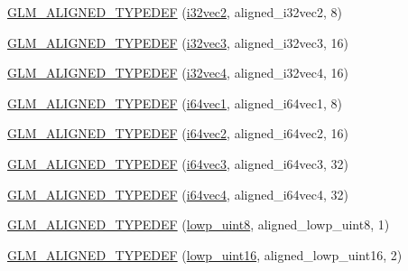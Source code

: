 \begin{DoxyCompactItemize}
\item 
\hyperlink{group__gtx__type__aligned_gaf90651cf2f5e7ee2b11cfdc5a6749534}{G\+L\+M\+\_\+\+A\+L\+I\+G\+N\+E\+D\+\_\+\+T\+Y\+P\+E\+D\+E\+F} (\hyperlink{group__gtc__type__precision_ga25820e641988fe33b075d80434872d02}{i32vec2}, aligned\+\_\+i32vec2, 8)
\item 
\hyperlink{group__gtx__type__aligned_ga7354a4ead8cb17868aec36b9c30d6010}{G\+L\+M\+\_\+\+A\+L\+I\+G\+N\+E\+D\+\_\+\+T\+Y\+P\+E\+D\+E\+F} (\hyperlink{group__gtc__type__precision_gab67e08f6a4b1bce82a9a34ecb2bfba64}{i32vec3}, aligned\+\_\+i32vec3, 16)
\item 
\hyperlink{group__gtx__type__aligned_gad2ecbdea18732163e2636e27b37981ee}{G\+L\+M\+\_\+\+A\+L\+I\+G\+N\+E\+D\+\_\+\+T\+Y\+P\+E\+D\+E\+F} (\hyperlink{group__gtc__type__precision_ga3ada3676600db65a425058c0a150d83e}{i32vec4}, aligned\+\_\+i32vec4, 16)
\item 
\hyperlink{group__gtx__type__aligned_ga965b1c9aa1800e93d4abc2eb2b5afcbf}{G\+L\+M\+\_\+\+A\+L\+I\+G\+N\+E\+D\+\_\+\+T\+Y\+P\+E\+D\+E\+F} (\hyperlink{group__gtc__type__precision_ga7ee2c91a98ebd719ae26e15ad89106de}{i64vec1}, aligned\+\_\+i64vec1, 8)
\item 
\hyperlink{group__gtx__type__aligned_ga1f9e9c2ea2768675dff9bae5cde2d829}{G\+L\+M\+\_\+\+A\+L\+I\+G\+N\+E\+D\+\_\+\+T\+Y\+P\+E\+D\+E\+F} (\hyperlink{group__gtc__type__precision_ga5a03cb457be28a9a8b9e61163fe648a1}{i64vec2}, aligned\+\_\+i64vec2, 16)
\item 
\hyperlink{group__gtx__type__aligned_gad77c317b7d942322cd5be4c8127b3187}{G\+L\+M\+\_\+\+A\+L\+I\+G\+N\+E\+D\+\_\+\+T\+Y\+P\+E\+D\+E\+F} (\hyperlink{group__gtc__type__precision_ga189eb8d6a197bc491cabb6e1f120ecf4}{i64vec3}, aligned\+\_\+i64vec3, 32)
\item 
\hyperlink{group__gtx__type__aligned_ga716f8ea809bdb11b5b542d8b71aeb04f}{G\+L\+M\+\_\+\+A\+L\+I\+G\+N\+E\+D\+\_\+\+T\+Y\+P\+E\+D\+E\+F} (\hyperlink{group__gtc__type__precision_gade5e969a6155752095d2cd603bda9408}{i64vec4}, aligned\+\_\+i64vec4, 32)
\item 
\hyperlink{group__gtx__type__aligned_gad46f8e9082d5878b1bc04f9c1471cdaa}{G\+L\+M\+\_\+\+A\+L\+I\+G\+N\+E\+D\+\_\+\+T\+Y\+P\+E\+D\+E\+F} (\hyperlink{group__gtc__type__precision_ga4d9dc08b7b248a386dfe9afd00fc6b1e}{lowp\+\_\+uint8}, aligned\+\_\+lowp\+\_\+uint8, 1)
\item 
\hyperlink{group__gtx__type__aligned_ga1246094581af624aca6c7499aaabf801}{G\+L\+M\+\_\+\+A\+L\+I\+G\+N\+E\+D\+\_\+\+T\+Y\+P\+E\+D\+E\+F} (\hyperlink{group__gtc__type__precision_ga9b8409887319f62f06e664f6ca121b9d}{lowp\+\_\+uint16}, aligned\+\_\+lowp\+\_\+uint16, 2)

\end{DoxyCompactItemize}
